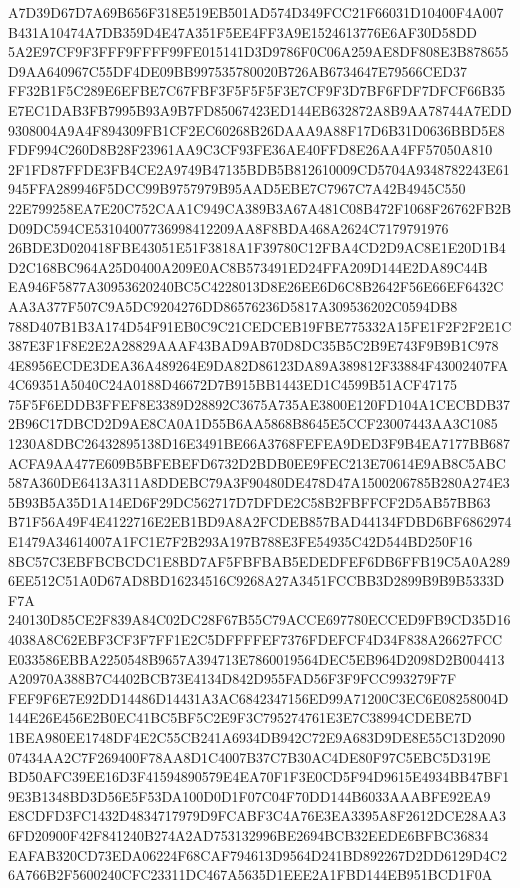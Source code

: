 \documentclass[UTF8,fontset=fandol,zihao=-4,a4paper]{ctexart}
\begin{document}
{{A7D39D67D7A69B656F318E519EB501AD574D349FCC21F66031D10400F4A007B431A10474A7DB359D4E47A351F5EE4FF3A9E1524613776E6AF30D58DD
5A2E97CF9F3FFF9FFFF99FE015141D3D9786F0C06A259AE8DF808E3B878655D9AA640967C55DF4DE09BB997535780020B726AB6734647E79566CED37
FF32B1F5C289E6EFBE7C67FBF3F5F5F5F3E7CF9F3D7BF6FDF7DFCF66B35E7EC1DAB3FB7995B93A9B7FD85067423ED144EB632872A8B9AA78744A7EDD
9308004A9A4F894309FB1CF2EC60268B26DAAA9A88F17D6B31D0636BBD5E8FDF994C260D8B28F23961AA9C3CF93FE36AE40FFD8E26AA4FF57050A810
2F1FD87FFDE3FB4CE2A9749B47135BDB5B812610009CD5704A9348782243E61945FFA289946F5DCC99B9757979B95AAD5EBE7C7967C7A42B4945C550
22E799258EA7E20C752CAA1C949CA389B3A67A481C08B472F1068F26762FB2BD09DC594CE53104007736998412209AA8F8BDA468A2624C7179791976
26BDE3D020418FBE43051E51F3818A1F39780C12FBA4CD2D9AC8E1E20D1B4D2C168BC964A25D0400A209E0AC8B573491ED24FFA209D144E2DA89C44B
EA946F5877A30953620240BC5C4228013D8E26EE6D6C8B2642F56E66EF6432CAA3A377F507C9A5DC9204276DD86576236D5817A309536202C0594DB8
788D407B1B3A174D54F91EB0C9C21CEDCEB19FBE775332A15FE1F2F2F2E1C387E3F1F8E2E2A28829AAAF43BAD9AB70D8DC35B5C2B9E743F9B9B1C978
4E8956ECDE3DEA36A489264E9DA82D86123DA89A389812F33884F43002407FA4C69351A5040C24A0188D46672D7B915BB1443ED1C4599B51ACF47175
75F5F6EDDB3FFEF8E3389D28892C3675A735AE3800E120FD104A1CECBDB372B96C17DBCD2D9AE8CA0A1D55B6AA5868B8645E5CCF23007443AA3C1085
1230A8DBC26432895138D16E3491BE66A3768FEFEA9DED3F9B4EA7177BB687ACFA9AA477E609B5BFEBEFD6732D2BDB0EE9FEC213E70614E9AB8C5ABC
587A360DE6413A311A8DDEBC79A3F90480DE478D47A1500206785B280A274E35B93B5A35D1A14ED6F29DC562717D7DFDE2C58B2FBFFCF2D5AB57BB63
B71F56A49F4E4122716E2EB1BD9A8A2FCDEB857BAD44134FDBD6BF6862974E1479A34614007A1FC1E7F2B293A197B788E3FE54935C42D544BD250F16
8BC57C3EBFBCBCDC1E8BD7AF5FBFBAB5EDEDFEF6DB6FFB19C5A0A2896EE512C51A0D67AD8BD16234516C9268A27A3451FCCBB3D2899B9B9B5333DF7A
240130D85CE2F839A84C02DC28F67B55C79ACCE697780ECCED9FB9CD35D164038A8C62EBF3CF3F7FF1E2C5DFFFFEF7376FDEFCF4D34F838A26627FCC
E033586EBBA2250548B9657A394713E7860019564DEC5EB964D2098D2B004413A20970A388B7C4402BCB73E4134D842D955FAD56F3F9FCC993279F7F
FEF9F6E7E92DD14486D14431A3AC6842347156ED99A71200C3EC6E08258004D144E26E456E2B0EC41BC5BF5C2E9F3C795274761E3E7C38994CDEBE7D
1BEA980EE1748DF4E2C55CB241A6934DB942C72E9A683D9DE8E55C13D209007434AA2C7F269400F78AA8D1C4007B37C7B30AC4DE80F97C5EBC5D319E
BD50AFC39EE16D3F41594890579E4EA70F1F3E0CD5F94D9615E4934BB47BF19E3B1348BD3D56E5F53DA100D0D1F07C04F70DD144B6033AAABFE92EA9
E8CDFD3FC1432D4834717979D9FCABF3C4A76E3EA3395A8F2612DCE28AA36FD20900F42F841240B274A2AD753132996BE2694BCB32EEDE6BFBC36834
EAFAB320CD73EDA06224F68CAF794613D9564D241BD892267D2DD6129D4C26A766B2F5600240CFC23311DC467A5635D1EEE2A1FBD144EB951BCD1F0A
}}
\end{document}
